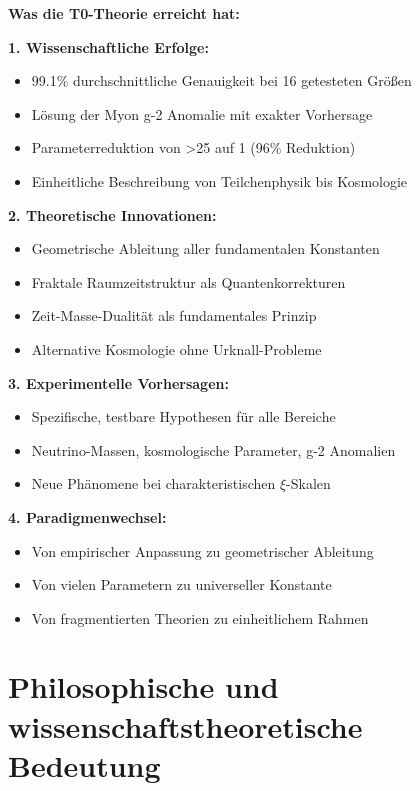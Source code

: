 \documentclass[12pt,a4paper]{article}
\begin{document}
	\begin{overview}
		\textbf{Was die T0-Theorie erreicht hat:}
		
		\textbf{1. Wissenschaftliche Erfolge:}
		\begin{itemize}
			\item 99.1\% durchschnittliche Genauigkeit bei 16 getesteten Größen
			\item Lösung der Myon g-2 Anomalie mit exakter Vorhersage
			\item Parameterreduktion von >25 auf 1 (96\% Reduktion)
			\item Einheitliche Beschreibung von Teilchenphysik bis Kosmologie
		\end{itemize}
		
		\textbf{2. Theoretische Innovationen:}
		\begin{itemize}
			\item Geometrische Ableitung aller fundamentalen Konstanten
			\item Fraktale Raumzeitstruktur als Quantenkorrekturen
			\item Zeit-Masse-Dualität als fundamentales Prinzip
			\item Alternative Kosmologie ohne Urknall-Probleme
		\end{itemize}
		
		\textbf{3. Experimentelle Vorhersagen:}
		\begin{itemize}
			\item Spezifische, testbare Hypothesen für alle Bereiche
			\item Neutrino-Massen, kosmologische Parameter, g-2 Anomalien
			\item Neue Phänomene bei charakteristischen $\xi$-Skalen
		\end{itemize}
		
		\textbf{4. Paradigmenwechsel:}
		\begin{itemize}
			\item Von empirischer Anpassung zu geometrischer Ableitung
			\item Von vielen Parametern zu universeller Konstante
			\item Von fragmentierten Theorien zu einheitlichem Rahmen
		\end{itemize}
	\end{overview}
	
	
	\section{Philosophische und wissenschaftstheoretische Bedeutung}
	
\end{document}
